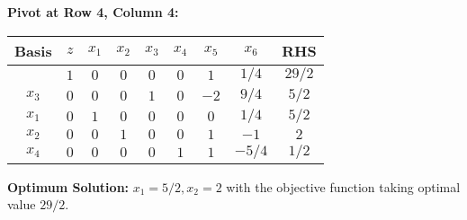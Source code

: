 \documentclass{article}[12pt,a4paper]
\begin{document}
\begin{enumerate}
  	  \noindent \textbf{Pivot at Row 4, Column 4:}
  	   \begin{center}
 	   \begin{tabular}{c | c | c c c c c c | c}
            		Basis & $z$ & $x_1$ & $x_2$ & $x_3$ & $x_4$ & $x_5$ & $x_6$ & RHS \\ \hline
  			           & $1$ & $0$ & $0$   & $0$ & $0$     & $1$ & $1/4$ & $29/2$  \\ \hline
  			$x_3$ & $0$ & $0$ & $0$   & $1$    & $0$  & $-2$ & $9/4$ & $5/2$ \\
  			$x_1$ & $0$ & $1$ & $0$  &  $0$    & $0$  & $0$ & $1/4$ & $5/2$ \\
  			$x_2$ & $0$ & $0$ & $1$ &   $0$    & $0$ & $1$ & $-1$ & $2$ \\
  			$x_4$ & $0$ & $0$ & $0$ &   $0$    & $1$ & $1$ & $-5/4$ & $1/2$ \\
  	  \end{tabular}
  	  \end{center}
	  
  	  \noindent \textbf{Optimum Solution:} $x_1 = 5/2, x_2 = 2$ with the objective function taking optimal value $29/2$. 
  	  
  \end{enumerate}
\end{document}
